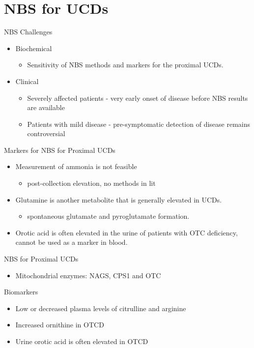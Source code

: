 \documentclass[presentation, smaller]{beamer}
\begin{document}
\section{NBS for UCDs}
\label{sec:orgheadline17}
\begin{frame}[label={sec:orgheadline7}]{NBS Challenges}
\begin{itemize}
\item Biochemical 
\begin{itemize}
\item Sensitivity of NBS methods and markers for the proximal UCDs.
\end{itemize}
\item Clinical 
\begin{itemize}
\item Severely affected patients - very early onset of disease before NBS results are available
\item Patients with mild disease - pre-symptomatic detection of disease remains controversial
\end{itemize}
\end{itemize}
\end{frame}

\begin{frame}[label={sec:orgheadline8}]{Markers for NBS for Proximal UCDs}
\begin{itemize}
\item Measurement of ammonia is not feasible
\begin{itemize}
\item post-collection elevation, no methods in lit
\end{itemize}
\item Glutamine is another metabolite that is generally elevated in UCDs.
\begin{itemize}
\item spontaneous glutamate and pyroglutamate formation.
\end{itemize}
\item Orotic acid is often elevated in the urine of patients with
OTC deficiency, cannot be used as a marker in blood.
\end{itemize}
\end{frame}

\begin{frame}[label={sec:orgheadline9}]{NBS for Proximal UCDs}
\begin{itemize}
\item Mitochondrial enzymes: NAGS, CPS1 and OTC
\end{itemize}

\begin{block}{Biomarkers}
\begin{itemize}
\item Low or decreased plasma levels of citrulline and arginine
\item Increased ornithine in OTCD
\item Urine orotic acid is often elevated in OTCD
\end{itemize}
\end{block}
\end{frame}
\end{document}
